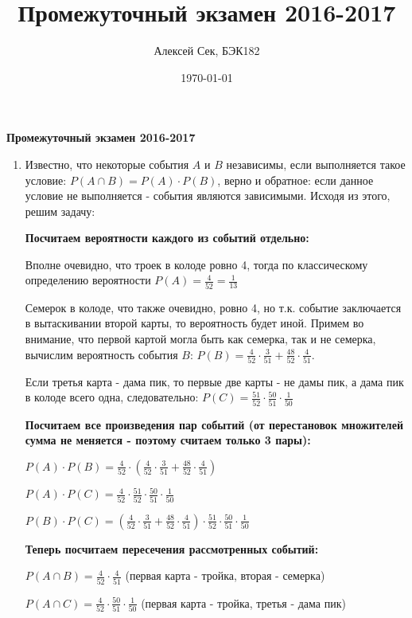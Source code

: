 \documentclass[a4paper]{article} %
\title{Промежуточный экзамен 2016-2017}
\author{Алексей Сек, БЭК182}
\date{\today}
\begin{document}
\maketitle

\textbf{Промежуточный экзамен 2016-2017}

\begin{enumerate}
    \item
    Известно, что некоторые события $A$ и $B$ независимы, если выполняется такое условие:
    $ P(A \cap B) = P(A) \cdot P(B) $, верно и обратное: если данное условие не выполняется - события являются зависимыми. Исходя из этого, решим задачу:
    
    \textbf{Посчитаем вероятности каждого из событий отдельно:}
    
    Вполне очевидно, что троек в колоде ровно 4, тогда по классическому определению вероятности $ P(A) = \frac{4}{52} = \frac{1}{13} $
    
    Семерок в колоде, что также очевидно, ровно 4, но т.к. событие заключается в вытаскивании второй карты, то вероятность будет иной.
    Примем во внимание, что первой картой могла быть как семерка, так и не семерка, вычислим вероятность события $ B$: $P(B) = \frac{4}{52}\cdot\frac{3}{51} + \frac{48}{52}\cdot\frac{4}{51} $.
    
    Если третья карта - дама пик, то первые две карты - не дамы пик, а дама пик в колоде всего одна, следовательно: $ P(C) = \frac{51}{52}\cdot\frac{50}{51}\cdot\frac{1}{50} $
    
    \textbf{Посчитаем все произведения пар событий (от перестановок множителей сумма не меняется - поэтому считаем только 3 пары):}
    
    $ P(A) \cdot P(B) = \frac{4}{52}\cdot(\frac{4}{52}\cdot\frac{3}{51} + \frac{48}{52}\cdot\frac{4}{51}) $
    
    $ P(A) \cdot P(C) = \frac{4}{52}\cdot\frac{51}{52}\cdot\frac{50}{51}\cdot\frac{1}{50} $
    
    $ P(B) \cdot P(C) = (\frac{4}{52}\cdot\frac{3}{51} + \frac{48}{52}\cdot\frac{4}{51})\cdot\frac{51}{52}\cdot\frac{50}{51}\cdot\frac{1}{50} $
    
    \textbf{Теперь посчитаем пересечения рассмотренных событий:}
    
    $ P(A \cap B) = \frac{4}{52}\cdot\frac{4}{51}$ (первая карта - тройка, вторая - семерка)
    
    $ P(A \cap C) = \frac{4}{52}\cdot\frac{50}{51}\cdot\frac{1}{50} $ (первая карта - тройка, третья - дама пик)
    

\end{enumerate}
\end{document}
